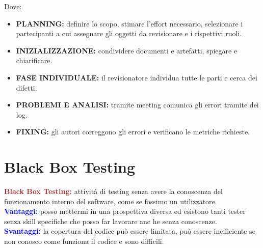 Dove:
\begin{itemize}
  \item \textbf{PLANNING:} definire lo scopo, stimare l'effort necessario, selezionare i
    partecipanti a cui assegnare gli oggetti da revisionare e i rispettivi ruoli.
  \item \textbf{INIZIALIZZAZIONE:} condividere documenti e artefatti, spiegare e chiarificare.
  \item \textbf{FASE INDIVIDUALE:} il revisionatore individua tutte le parti e cerca dei difetti.
  \item \textbf{PROBLEMI E ANALISI:} tramite meeting comunica gli errori tramite dei log.
  \item \textbf{FIXING:} gli autori correggono gli errori e verificano le metriche richieste.
\end{itemize}

\section{Black Box Testing}
\begin{boxDef}
\textbf{\textcolor{brown}{Black Box Testing:}} attività di testing senza avere la conoscenza del funzionamento interno del software, come se fossimo un utilizzatore. \\ 
\textbf{\textcolor{blue}{Vantaggi:}} posso mettermi in una prospettiva diversa ed esistono tanti tester senza skill specifiche che posso far lavorare anc he senza conoscenze. \\ 
\textbf{\textcolor{blue}{Svantaggi:}} la copertura del codice può essere limitata, può essere inefficiente se non conosco come funziona il codice e sono difficili.
\end{boxDef}

